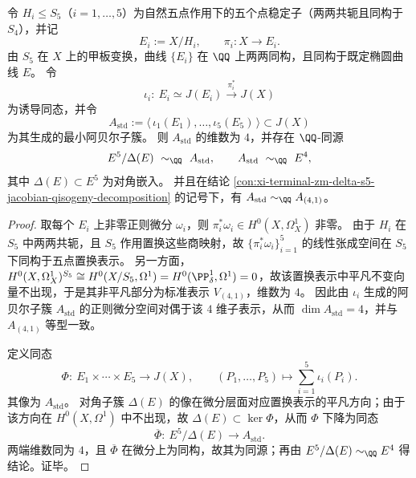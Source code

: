 \begin{conclusion}\label{con:xi-terminal-zm-delta-jacobian-standard-part-e4}
令 \(H_i\le S_5\)（\(i=1,\dots,5\)）为自然五点作用下的五个点稳定子（两两共轭且同构于 \(S_4\)），并记
\[
E_i:=X/H_i,\qquad \pi_i:X\to E_i.
\]
由 \(S_5\) 在 \(X\) 上的甲板变换，曲线 \(\{E_i\}\) 在 \(\QQ\) 上两两同构，且同构于既定椭圆曲线 \(E\)。
令
\[
\iota_i:\ E_i\simeq J(E_i)\xrightarrow{\ \pi_i^*\ }J(X)
\]
为诱导同态，并令
\[
A_{\mathrm{std}}:=\langle\,\iota_1(E_1),\dots,\iota_5(E_5)\,\rangle\subset J(X)
\]
为其生成的最小阿贝尔子簇。
则 \(A_{\mathrm{std}}\) 的维数为 \(4\)，并存在 \(\QQ\)-同源
\[
E^5/\Delta(E)\ \sim_{\QQ}\ A_{\mathrm{std}},
\qquad
 A_{\mathrm{std}}\ \sim_{\QQ}\ E^4,
\]
其中 \(\Delta(E)\subset E^5\) 为对角嵌入。
并且在结论 \ref{con:xi-terminal-zm-delta-s5-jacobian-qisogeny-decomposition} 的记号下，有
\(
A_{\mathrm{std}}\sim_{\QQ}A_{(4,1)}
\)。
\end{conclusion}
\begin{proof}
取每个 \(E_i\) 上非零正则微分 \(\omega_i\)，则 \(\pi_i^*\omega_i\in H^0(X,\Omega_X^1)\) 非零。
由于 \(H_i\) 在 \(S_5\) 中两两共轭，且 \(S_5\) 作用置换这些商映射，故 \(\{\pi_i^*\omega_i\}_{i=1}^{5}\) 的线性张成空间在 \(S_5\) 下同构于五点置换表示。
另一方面，\(H^0(X,\Omega_X^1)^{S_5}\cong H^0(X/S_5,\Omega^1)=H^0(\PP^1_\delta,\Omega^1)=0\)，故该置换表示中平凡不变向量不出现，于是其非平凡部分为标准表示 \(V_{(4,1)}\)，维数为 \(4\)。
因此由 \(\iota_i\) 生成的阿贝尔子簇 \(A_{\mathrm{std}}\) 的正则微分空间对偶于该 \(4\) 维子表示，从而 \(\dim A_{\mathrm{std}}=4\)，并与 \(A_{(4,1)}\) 等型一致。
\par
定义同态
\[
\Phi:\ E_1\times\cdots\times E_5\longrightarrow J(X),\qquad
(P_1,\dots,P_5)\longmapsto \sum_{i=1}^5 \iota_i(P_i).
\]
其像为 \(A_{\mathrm{std}}\)。
对角子簇 \(\Delta(E)\) 的像在微分层面对应置换表示的平凡方向；由于该方向在 \(H^0(X,\Omega^1)\) 中不出现，故 \(\Delta(E)\subset\ker\Phi\)，从而 \(\Phi\) 下降为同态
\[
\overline{\Phi}:\ E^5/\Delta(E)\longrightarrow A_{\mathrm{std}}.
\]
两端维数同为 \(4\)，且 \(\overline{\Phi}\) 在微分上为同构，故其为同源；再由 \(E^5/\Delta(E)\sim_{\QQ}E^4\) 得结论。证毕。
\end{proof}

\endinput
